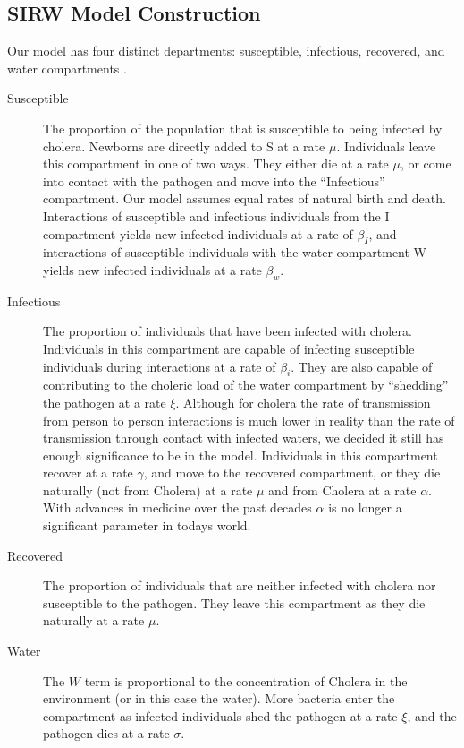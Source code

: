 \documentclass[12pt]{article}\usepackage[]{graphicx}\usepackage[]{color}
\begin{document}
\subsection{SIRW Model Construction}
Our model has four distinct departments: susceptible, infectious, recovered, and water compartments \citep{link9}.
\begin{description}
    \item [Susceptible] The proportion of the population that is susceptible to being infected by cholera.
Newborns are directly added to S at a rate $\mu$.
Individuals leave this compartment in one of two ways. They either die at a rate $\mu$, or come into contact with the pathogen and move into the “Infectious” compartment. Our model assumes equal rates of natural birth and death.
Interactions of susceptible and infectious individuals from the I compartment yields new infected individuals at a rate of $\beta_I$, and interactions of susceptible individuals with the water compartment W yields new infected individuals at a rate $\beta_w$.\par
  \item [Infectious] The proportion of individuals that have been infected with cholera.
Individuals in this compartment are capable of infecting susceptible individuals during interactions at a rate of $\beta_i$.
They are also capable of contributing to the choleric load of the water compartment by “shedding” the pathogen at a rate $\xi$.
Although for cholera the rate of transmission from person to person interactions is much lower in reality than the rate of transmission through contact with infected waters, we decided it still has enough significance to be in the model.
Individuals in this compartment recover at a rate $\gamma$, and move to the recovered compartment, or they die naturally (not from Cholera) at a rate $\mu$ and from Cholera at a rate $\alpha$.
With advances in medicine over the past decades $\alpha$ is no longer a significant parameter in todays world.\par
  \item [Recovered] The proportion of individuals that are neither infected with cholera nor susceptible to the pathogen.
They leave this compartment as they die naturally at a rate $\mu$.
  \item [Water] The $W$ term is proportional to the concentration of Cholera in the environment (or in this case the water).
More bacteria enter the compartment as infected individuals shed the pathogen at a rate $\xi$, and the pathogen dies at a rate $\sigma$.
\end{description}
\end{document}
